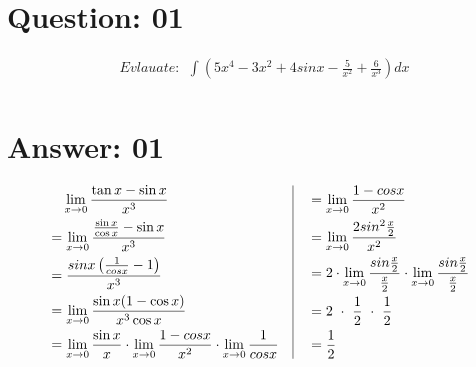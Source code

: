 \documentclass[17pt]{extarticle}
\begin{document}
\noindent

\begin{fleqn} 


\section{Question: 01}

\begin{equation} \nonumber
\begin{alignedat}{4}
& Evlauate :\ \  \int \left( 5x^4-3x^2+4sinx - \frac{5}{x^2}+\frac{6}{x^3}\right) dx\\
\end{alignedat}
\end{equation}


\section{Answer: 01}

\begin{equation} \nonumber
\begin{alignedat}{4}
& \texttt{\ \ } \lim_{x \to 0} \frac{\tan{x} - \sin{x}}{x^3}\\
&= \lim_{x \to 0} \frac{\frac{\sin{x}}{\cos{x}}-\sin{x}}{x^3}\\
&= \frac{sin x\left(\frac{1}{cos x} - 1\right)}{x^3}\\
&= \lim_{x \to 0} \frac{\sin{x}(1  - \cos{x})}{x^3\cos{x}}\\
&= \lim_{x \to 0} \frac{\sin{x}}{x}\cdot\lim_{x \to 0} \frac{1 - cos x}{x^2}\cdot\lim_{x \to 0}\frac{1}{cos x}\\
\end{alignedat}
\quad
\vrule
\quad
\begin{alignedat}{4}
&= \lim_{x \to 0} \frac{1 - cos x}{x^2}\\
&= \lim_{x \to 0} \frac{2sin^2\frac{x}{2}}{x^2}\\
&= 2\cdot\lim_{x \to 0} \frac{sin\frac{x}{2}}{\frac{x}{2}}\cdot\lim_{x \to 0} \frac{sin\frac{x}{2}}{\frac{x}{2}}\\
&= 2\ \cdot\ \frac{1}{2}\ \cdot\ \frac{1}{2}\\
&= \frac{1}{2}
\end{alignedat}
\end{equation}



\end{fleqn}
\end{document}
